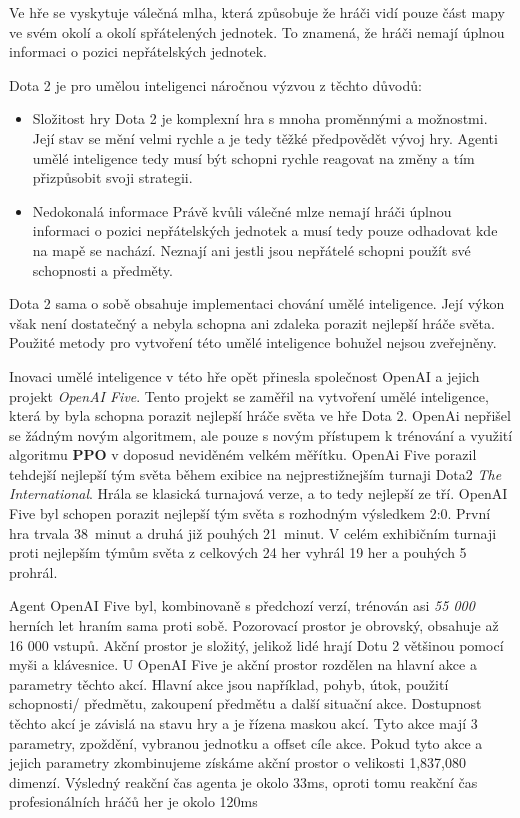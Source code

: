 Ve hře se vyskytuje válečná mlha, která způsobuje že hráči vidí pouze část mapy ve svém okolí a okolí spřátelených jednotek.
To znamená, že hráči nemají úplnou informaci o pozici nepřátelských jednotek.

\bigskip

Dota 2 je pro umělou inteligenci náročnou výzvou z těchto důvodů:
\begin{itemize}
  \item Složitost hry
  Dota 2 je komplexní hra s mnoha proměnnými a možnostmi.
  Její stav se mění velmi rychle a je tedy těžké předpovědět vývoj hry.
  Agenti umělé inteligence tedy musí být schopni rychle reagovat na změny a tím přizpůsobit svoji strategii.
  \item Nedokonalá informace
  Právě kvůli válečné mlze nemají hráči úplnou informaci o pozici nepřátelských jednotek a musí tedy pouze odhadovat kde na mapě se nachází.
  Neznají ani jestli jsou nepřátelé schopni použít své schopnosti a předměty.
\end{itemize}

Dota 2 sama o sobě obsahuje implementaci chování umělé inteligence.
Její výkon však není dostatečný a nebyla schopna ani zdaleka porazit nejlepší hráče světa.
Použité metody pro vytvoření této umělé inteligence bohužel nejsou zveřejněny.

Inovaci umělé inteligence v této hře opět přinesla společnost OpenAI a jejich projekt \emph{OpenAI Five}\cite{Dota2}.
Tento projekt se zaměřil na vytvoření umělé inteligence, která by byla schopna porazit nejlepší hráče světa ve hře Dota 2.
OpenAi nepřišel se žádným novým algoritmem, ale pouze s novým přístupem k trénování a využití algoritmu \textbf{PPO} v doposud neviděném velkém měřítku. 
OpenAi Five porazil tehdejší nejlepší tým světa během exibice na nejprestižnejším turnaji Dota2 \textit{The International}.
Hrála se klasická turnajová verze, a to tedy nejlepší ze tří.
OpenAI Five byl schopen porazit nejlepší tým světa s rozhodným výsledkem 2:0.
První hra trvala 38~minut a druhá již pouhých 21~minut.
V celém exhibičním turnaji proti nejlepším týmům světa z celkových 24 her vyhrál 19 her a pouhých 5 prohrál.

Agent OpenAI Five byl, kombinovaně s předchozí verzí, trénován asi \emph{55 000} herních let hraním sama proti sobě.
Pozorovací prostor je obrovský, obsahuje až 16 000 vstupů.
Akční prostor je složitý, jelikož lidé hrají Dotu 2 většinou pomocí myši a klávesnice.
U OpenAI Five je akční prostor rozdělen na hlavní akce a parametry těchto akcí.
Hlavní akce jsou například, pohyb, útok, použití schopnosti/ předmětu, zakoupení předmětu a další situační akce.
Dostupnost těchto akcí je závislá na stavu hry a je řízena maskou akcí.
Tyto akce mají 3 parametry, zpoždění, vybranou jednotku a offset cíle akce.
Pokud tyto akce a jejich parametry zkombinujeme získáme akční prostor o velikosti 1,837,080 dimenzí.
Výsledný reakční čas agenta je okolo 33ms, oproti tomu reakční čas profesionálních hráčů her je okolo 120ms\cite{reaction_time}

